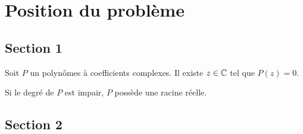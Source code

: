 \chapter{Position du problème}

\section{Section 1}

\begin{theorem}
  \label{thm-fondamental-algebre}
  Soit $P$ un polynômes à coefficients complexes.  Il existe $z \in
  \IC$ tel que $P(z) = 0$.
\end{theorem}

\begin{remark}
  \label{root-odd-poly}
  Si le degré de $P$ est impair, $P$ possède une racine réelle.
\end{remark}


\section{Section 2}



\endinput

